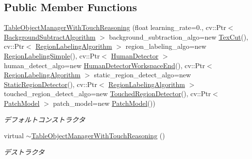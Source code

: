 \subsection*{Public Member Functions}
\begin{DoxyCompactItemize}
\item 
\hypertarget{classskl_1_1_table_object_manager_with_touch_reasoning_afce161bd43896b8b274fc1b021b39a76}{}\label{classskl_1_1_table_object_manager_with_touch_reasoning_afce161bd43896b8b274fc1b021b39a76} 
\hyperlink{classskl_1_1_table_object_manager_with_touch_reasoning_afce161bd43896b8b274fc1b021b39a76}{Table\+Object\+Manager\+With\+Touch\+Reasoning} (float learning\+\_\+rate=0., cv\+::\+Ptr$<$ \hyperlink{classskl_1_1_background_subtract_algorithm}{Background\+Subtract\+Algorithm} $>$ background\+\_\+subtraction\+\_\+algo=new \hyperlink{classskl_1_1_tex_cut}{Tex\+Cut}(), cv\+::\+Ptr$<$ \hyperlink{classskl_1_1_filter_mat2_mat}{Region\+Labeling\+Algorithm} $>$ region\+\_\+labeling\+\_\+algo=new \hyperlink{classskl_1_1_region_labeling_simple}{Region\+Labeling\+Simple}(), cv\+::\+Ptr$<$ \hyperlink{classskl_1_1_filter_mat2_mat}{Human\+Detector} $>$ human\+\_\+detect\+\_\+algo=new \hyperlink{classskl_1_1_human_detector_workspace_end}{Human\+Detector\+Workspace\+End}(), cv\+::\+Ptr$<$ \hyperlink{classskl_1_1_filter_mat2_mat}{Region\+Labeling\+Algorithm} $>$ static\+\_\+region\+\_\+detect\+\_\+algo=new \hyperlink{classskl_1_1_static_region_detector}{Static\+Region\+Detector}(), cv\+::\+Ptr$<$ \hyperlink{classskl_1_1_filter_mat2_mat}{Region\+Labeling\+Algorithm} $>$ touched\+\_\+region\+\_\+detect\+\_\+algo=new \hyperlink{classskl_1_1_touched_region_detector}{Touched\+Region\+Detector}(), cv\+::\+Ptr$<$ \hyperlink{classskl_1_1_patch_model}{Patch\+Model} $>$ patch\+\_\+model=new \hyperlink{classskl_1_1_patch_model}{Patch\+Model}())
\begin{DoxyCompactList}\small\item\em デフォルトコンストラクタ \end{DoxyCompactList}\item 
\hypertarget{classskl_1_1_table_object_manager_with_touch_reasoning_a4d38c192d84e9184d11f2bbe55733e4f}{}\label{classskl_1_1_table_object_manager_with_touch_reasoning_a4d38c192d84e9184d11f2bbe55733e4f} 
virtual \hyperlink{classskl_1_1_table_object_manager_with_touch_reasoning_a4d38c192d84e9184d11f2bbe55733e4f}{$\sim$\+Table\+Object\+Manager\+With\+Touch\+Reasoning} ()
\begin{DoxyCompactList}\small\item\em デストラクタ \end{DoxyCompactList}\item 

\end{DoxyCompactItemize}
